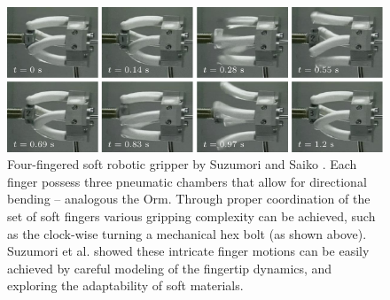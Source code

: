 \begin{figure}[!t]
  \includegraphics*[width=\textwidth]{./pdf/thesis-figure-2-7.pdf}
  \caption{Four-fingered soft robotic gripper by Suzumori and Saiko \cite{Suzumori1991,Suzumori1992}. Each finger possess three pneumatic chambers that allow for directional bending -- analogous the Orm. Through proper coordination of the set of soft fingers various gripping complexity can be achieved, such as the clock-wise turning a mechanical hex bolt (as shown above). Suzumori et al. showed these intricate finger motions can be easily achieved by careful modeling of the fingertip dynamics, and exploring the adaptability of soft materials.
  \label{fig:C0:fist_grip_robot}}
  \vspace{-3mm}
  
\end{figure}


